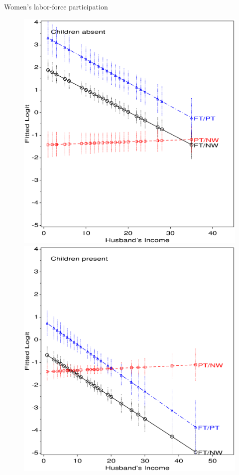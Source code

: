 \begin{Example}[wlfpart2]{Women's labor-force participation}
\begin{figure}[htb]
 \begin{minipage}[b]{.49\linewidth}
  \centering
  \includegraphics[width=1\linewidth]{ch6/fig/wlfpart35}
 \end{minipage}%
 \hfill
 \begin{minipage}[b]{.49\linewidth}
  \centering
  \includegraphics[width=1\linewidth]{ch6/fig/wlfpart36}

\end{minipage}
\end{figure}
\end{Example}
